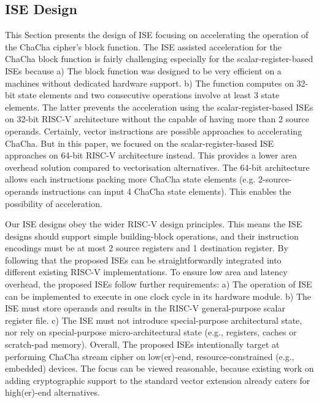 \subsection{ISE Design}

This Section presents the design of ISE focusing on accelerating the operation of the ChaCha cipher's block function. 
The ISE assisted acceleration for the ChaCha block function is fairly challenging especially for the scalar-register-based ISEs because 
a) The block function was designed to be very efficient on a machines without dedicated hardware support. 
b) The function computes on 32-bit state elements and two consecutive operations involve at least 3 state elements. 
The latter prevents the acceleration using the scalar-register-based ISEs on 32-bit RISC-V architecture without the capable of having more than 2 source operands.
Certainly, vector instructions are possible approaches to accelerating ChaCha. 
But in this paper, we focused on the scalar-register-based ISE approaches on 64-bit RISC-V architecture instead. 
This provides a lower area overhead solution compared to vectorisation alternatives. 
The 64-bit architecture allows each instructions packing more ChaCha state elements (e.g. 2-source-operands instructions can input 4 ChaCha state elements). 
This enables the possibility of acceleration.

Our ISE designs obey the wider RISC-V design principles. 
This means the ISE designs should support simple building-block operations, and their instruction encodings must be at most 2 source registers and 1 destination register. 
By following that the proposed ISEs can be straightforwardly integrated into different existing RISC-V implementations.
To ensure low area and latency overhead, the proposed ISEs follow further requirements: 
a) The operation of ISE can be implemented to execute in one clock cycle in its hardware module. 
b) The ISE must store operands and results in the RISC-V general-purpose scalar register file. 
c) The ISE must not introduce special-purpose architectural state, nor rely on special-purpose micro-architectural state (e.g., registers, caches or scratch-pad memory).
Overall, The proposed ISEs intentionally target at performing ChaCha stream cipher on low(er)-end, resource-constrained (e.g., embedded) devices. The focus can be viewed reasonable, because existing work on adding cryptographic support to the standard vector extension \cite{riscv:ext:vector:draft} already caters for high(er)-end alternatives. 

